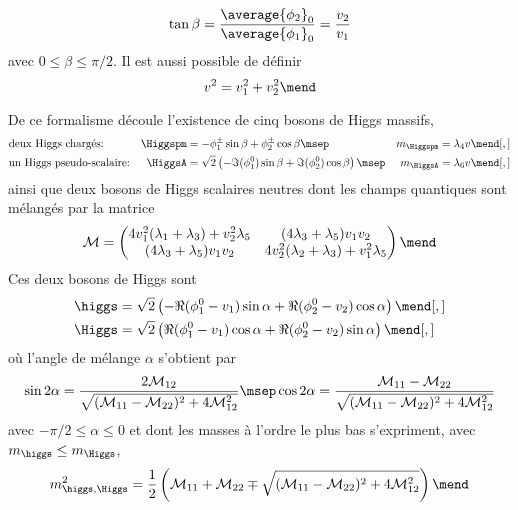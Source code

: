 \begin{equation}
\tan\beta = \frac{\average{\phi_2}_0}{\average{\phi_1}_0} = \frac{v_2}{v_1}
\label{eq-tan_beta-2HDM}
\end{equation}
avec $0\leq\beta\leq\pi/2$.
Il est aussi possible de définir
\begin{equation}
v^2 = v_1^2+v_2^2
\mend
\end{equation}
\par De ce formalisme découle l'existence de cinq bosons de Higgs massifs,
\begin{align}
&
\text{deux Higgs chargés:}
&
\Higgspm &= - \phi_1^\pm \sin\beta + \phi_2^\pm \cos\beta
\msep&
m_{\Higgspm} &= \lambda_4 v
\mend[,]
\\
&
\text{un Higgs pseudo-scalaire:}
&
\HiggsA &= \sqrt{2}\left(-\Im(\phi_1^0)\sin\beta+\Im(\phi_2^0)\cos\beta\right)
\msep&
m_{\HiggsA} &= \lambda_6 v
\mend[,]
\end{align}
ainsi que deux bosons de Higgs scalaires neutres dont les champs quantiques sont mélangés par la matrice
\begin{equation}
\mathcal{M} = \begin{pmatrix}
4v_1^2 (\lambda_1+\lambda_3) + v_2^2\lambda_5 & (4\lambda_3+\lambda_5)v_1v_2 \\
(4\lambda_3+\lambda_5)v_1v_2 & 4v_2^2 (\lambda_2+\lambda_3) + v_1^2\lambda_5
\end{pmatrix}
\mend
\end{equation}
Ces deux bosons de Higgs sont
\begin{align}
\higgs &= \sqrt{2}\left(-\Re(\phi_1^0-v_1)\sin\alpha+\Re(\phi_2^0-v_2)\cos\alpha\right)
\mend[,]
\\
\Higgs &= \sqrt{2}\left(\Re(\phi_1^0-v_1)\cos\alpha+\Re(\phi_2^0-v_2)\sin\alpha\right)
\mend[,]
\end{align}
où l'angle de mélange $\alpha$ s'obtient par
\begin{equation}
\sin 2\alpha = \frac{2\mathcal{M}_{12}}{\sqrt{(\mathcal{M}_{11}-\mathcal{M}_{22})^2+4\mathcal{M}_{12}^2}}
\msep
\cos 2\alpha = \frac{\mathcal{M}_{11}-\mathcal{M}_{22}}{\sqrt{(\mathcal{M}_{11}-\mathcal{M}_{22})^2+4\mathcal{M}_{12}^2}}
\end{equation}
avec $-\pi/2\leq\alpha\leq0$
et
dont les masses à l'ordre le plus bas s'expriment, avec $m_{\higgs} \leq m_{\Higgs}$,
\begin{equation}
m_{\higgs,\Higgs}^2 = \frac{1}{2} \left( \mathcal{M}_{11} + \mathcal{M}_{22} \mp \sqrt{(\mathcal{M}_{11}-\mathcal{M}_{22})^2+4\mathcal{M}_{12}^2} \right)
\mend
\end{equation}
